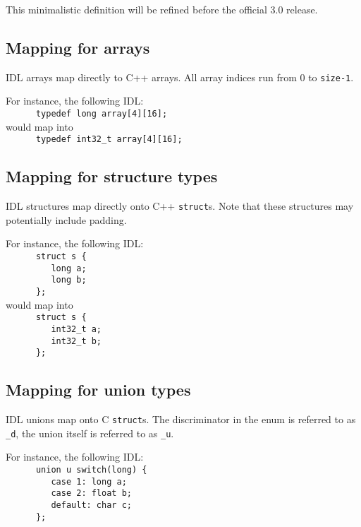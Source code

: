 This minimalistic definition will be refined before the official 3.0 \GenoM{}
release.


\subsection{Mapping for arrays}

\GenoM{} IDL arrays map directly to C++ arrays. All array indices run from 0 to
{\tt size-1}.

For instance, the following IDL:\hfill\\
\verb|      typedef long array[4][16];|\hfill\\

would map into\hfill\\
\verb|      typedef int32_t array[4][16];|\hfill\\


\subsection{Mapping for structure types}

\GenoM{} IDL  structures map directly onto  C++ {\tt struct}s.  Note that these
structures may potentially include padding.

For instance, the following IDL:\hfill\\
\verb|      struct s {|\hfill\\
\verb|         long a;|\hfill\\
\verb|         long b;|\hfill\\
\verb|      };|\hfill\\

would map into\hfill\\
\verb|      struct s {|\hfill\\
\verb|         int32_t a;|\hfill\\
\verb|         int32_t b;|\hfill\\
\verb|      };|\hfill\\


\subsection{Mapping for union types}

\GenoM{} IDL unions map onto C  {\tt struct}s. The discriminator in the enum is
referred to as  {\tt \_d}, the union  itself is referred to as  {\tt \_u}.

For instance, the following IDL:\hfill\\
\verb|      union u switch(long) {|\hfill\\
\verb|         case 1: long a;|\hfill\\
\verb|         case 2: float b;|\hfill\\
\verb|         default: char c;|\hfill\\
\verb|      };|\hfill\\

